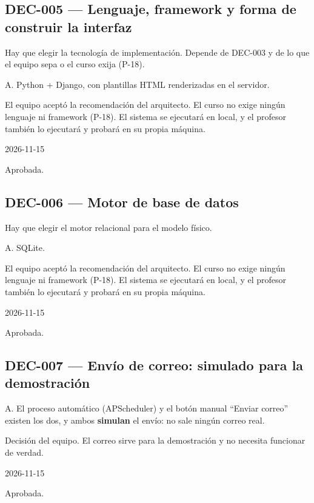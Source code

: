 \subsection{DEC-005 — Lenguaje, framework y forma de construir la interfaz}
\begin{description}[style=nextline]
  \item[Problema] Hay que elegir la tecnología de implementación. Depende de DEC-003 y de lo que el equipo sepa o el curso exija (P-18).
  \item[Decisión seleccionada] A. Python + Django, con plantillas HTML renderizadas en el servidor.
  \item[Justificación] El equipo aceptó la recomendación del arquitecto. El curso no exige ningún lenguaje ni framework (P-18). El sistema se ejecutará en local, y el profesor también lo ejecutará y probará en su propia máquina.
  \item[Fecha] 2026-11-15
  \item[Estado] Aprobada.
\end{description}
\subsection{DEC-006 — Motor de base de datos}
\begin{description}[style=nextline]
  \item[Problema] Hay que elegir el motor relacional para el modelo físico.
  \item[Decisión seleccionada] A. SQLite.
  \item[Justificación] El equipo aceptó la recomendación del arquitecto. El curso no exige ningún lenguaje ni framework (P-18). El sistema se ejecutará en local, y el profesor también lo ejecutará y probará en su propia máquina.
  \item[Fecha] 2026-11-15
  \item[Estado] Aprobada.
\end{description}
\subsection{DEC-007 — Envío de correo: simulado para la demostración}
\begin{description}[style=nextline]
  \item[Decisión seleccionada] A. El proceso automático (APScheduler) y el botón manual ``Enviar correo'' existen los dos, y ambos \textbf{simulan} el envío: no sale ningún correo real.
  \item[Justificación] Decisión del equipo. El correo sirve para la demostración y no necesita funcionar de verdad.
  \item[Fecha] 2026-11-15
  \item[Estado] Aprobada.
\end{description}
